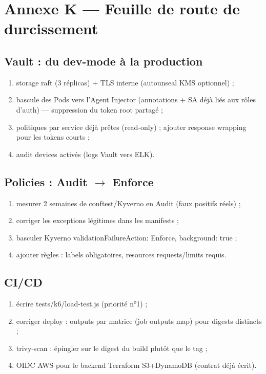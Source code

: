 \documentclass[12pt,a4paper]{article}
\begin{document}
\section*{Annexe K --- Feuille de route de durcissement}

\subsection*{Vault : du dev-mode à la production}
\begin{enumerate}[itemsep=1pt]
  \item storage raft (3 réplicas) + TLS interne (autounseal KMS optionnel) ;
  \item bascule des Pods vers l'Agent Injector (annotations + SA déjà liés aux rôles d'auth) --- suppression du token root partagé ;
  \item politiques par service déjà prêtes (read-only) ; ajouter response wrapping pour les tokens courts ;
  \item audit devices activés (logs Vault vers ELK).
\end{enumerate}

\subsection*{Policies : Audit $\rightarrow$ Enforce}
\begin{enumerate}[itemsep=1pt]
  \item mesurer 2 semaines de conftest/Kyverno en Audit (faux positifs réels) ;
  \item corriger les exceptions légitimes dans les manifests ;
  \item basculer Kyverno validationFailureAction: Enforce, background: true ;
  \item ajouter règles : labels obligatoires, resources requests/limits requis.
\end{enumerate}

\subsection*{CI/CD}
\begin{enumerate}[itemsep=1pt]
  \item écrire tests/k6/load-test.js (priorité n°1) ;
  \item corriger deploy : outputs par matrice (job outputs map) pour digests distincts ;
  \item trivy-scan : épingler sur le digest du build plutôt que le tag ;
  \item OIDC AWS pour le backend Terraform S3+DynamoDB (contrat déjà écrit).
\end{enumerate}
\end{document}
